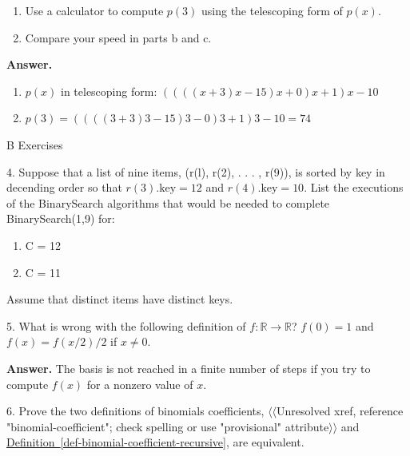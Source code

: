 \documentclass[10pt,]{book}
\theoremstyle{plain}
\theoremstyle{definition}
\theoremstyle{definition}
\theoremstyle{definition}
\theoremstyle{definition}
\numberwithin{equation}{section}
\begin{document}
\begin{exercisegroup}
\begin{enumerate}[label=\alph*]
\item\hypertarget{li-10}{} Use a calculator to compute \(p(3)\) using the telescoping form of \(p(x)\).%
\item\hypertarget{li-11}{} Compare your speed in parts b and c.%
\end{enumerate}
%
\par\smallskip
\par\smallskip
\noindent\textbf{Answer.}\hypertarget{answer-2}{}\quad
\leavevmode%
\begin{enumerate}[label=\alph*]
\item\hypertarget{li-12}{} \(p(x)\) in telescoping form: \(((((x+3)x-15)x+0)x+1)x-10\)%
\item\hypertarget{li-13}{} \(p(3)=((((3+3)3-15)3-0)3+1)3-10=74\)%
\end{enumerate}
%
\end{exercisegroup}
\par\smallskip\noindent
\hypertarget{exercisegroup-2}{}\typeout{************************************************}
\typeout{************************************************}
B Exercises%
\begin{exercisegroup}
\item[4.]\hypertarget{exercise-4}{} Suppose that a list of nine items, (r(l), r(2), . . . , r(9)), is sorted by key in decending order so that \(r(3).\textrm{key} = 12\) and \(r(4).\textrm{key} = 10\). List the executions of the BinarySearch algorithms that would be needed to complete BinarySearch(1,9) for:%
\par
\leavevmode%
\begin{multicols}{2}
\begin{enumerate}[label=\alph*]
\item\hypertarget{li-14}{} C = 12%
\item\hypertarget{li-15}{} C = 11%
\end{enumerate}
\end{multicols}
%
\par
Assume that distinct items have distinct keys.%
\par\smallskip
\item[5.]\hypertarget{exercise-5}{} What is wrong with the following definition of \(f:\mathbb{R}\to \mathbb{R}\)? 
\(f(0) = 1\) and \(f(x) = f(x/2)/2\) if \(x\neq 0\).%
\par\smallskip
\par\smallskip
\noindent\textbf{Answer.}\hypertarget{answer-3}{}\quad
The basis is not reached in a finite number of steps if you try to compute \(f(x)\) for a nonzero value of \(x\).%
\item[6.]\hypertarget{exercise-6}{}Prove the two definitions of binomials coefficients, {$\langle\langle$Unresolved xref, reference "binomial-coefficient"; check spelling or use "provisional" attribute$\rangle\rangle$} and \hyperref[def-binomial-coefficient-recursive]{Definition~\ref{def-binomial-coefficient-recursive}}, are equivalent.%
\par\smallskip
\end{exercisegroup}
\end{document}
